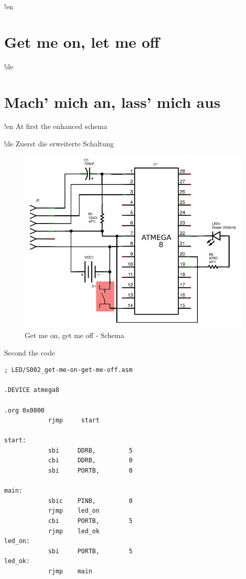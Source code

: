 !en \section{Get me on, let me off}
!de \section{Mach' mich an, lass' mich aus}

!en At first the enhanced schema

!de Zuerst die erweiterte Schaltung

\begin{figure}[htbp]
  \centering
  \includegraphics[width=120mm]{LED/S002_get-me-on-get-me-off_Circuit_schema.png}
  \caption{Get me on, get me off - Schema}
  \label{atmega8-get-me-on-get-me-off-schema}
\end{figure}


Second the code


\begin{lstlisting}
; LED/S002_get-me-on-get-me-off.asm

.DEVICE atmega8

.org 0x0000
            rjmp     start

start:
            sbi     DDRB,         5
            cbi     DDRB,         0
            sbi     PORTB,        0

main:
            sbic    PINB,         0
            rjmp    led_on
            cbi     PORTB,        5
            rjmp    led_ok
led_on:
            sbi     PORTB,        5
led_ok:
            rjmp    main
\end{lstlisting}

